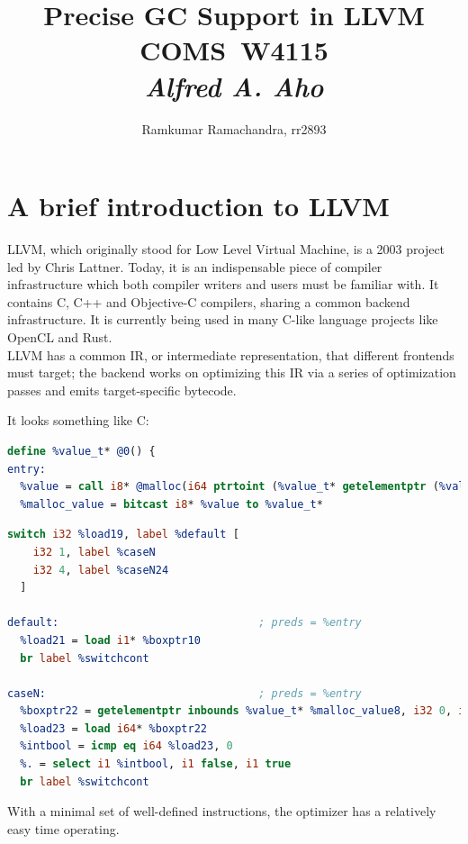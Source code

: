 \documentclass{article}
\title{
\vspace{2in}
\textmd{\textbf{Precise GC Support in LLVM}}\\
\vspace{0.1in}\large{COMS\ W4115}\\
\vspace{0.1in}\large{\textit{Alfred A. Aho}}
\vspace{2in}
}
\author{Ramkumar Ramachandra, rr2893}
\begin{document}
\maketitle
\newpage
\tableofcontents
\newpage
\section{A brief introduction to LLVM}
LLVM, which originally stood for Low Level Virtual Machine, is a 2003
project led by Chris Lattner. Today, it is an indispensable piece of
compiler infrastructure which both compiler writers and users must be
familiar with. It contains C, C++ and Objective-C compilers, sharing a
common backend infrastructure. It is currently being used in many
C-like language projects like OpenCL and Rust.\\

LLVM has a common IR, or intermediate representation, that different
frontends must target; the backend works on optimizing this IR via a
series of optimization passes and emits target-specific bytecode.

It looks something like C:
\begin{lstlisting}[language=llvm]
define %value_t* @0() {
entry:
  %value = call i8* @malloc(i64 ptrtoint (%value_t* getelementptr (%value_t* null, i32 1) to i64))
  %malloc_value = bitcast i8* %value to %value_t*
\end{lstlisting}

\begin{lstlisting}[language=llvm]
  switch i32 %load19, label %default [
    i32 1, label %caseN
    i32 4, label %caseN24
  ]

default:                               ; preds = %entry
  %load21 = load i1* %boxptr10
  br label %switchcont

caseN:                                 ; preds = %entry
  %boxptr22 = getelementptr inbounds %value_t* %malloc_value8, i32 0, i32 1
  %load23 = load i64* %boxptr22
  %intbool = icmp eq i64 %load23, 0
  %. = select i1 %intbool, i1 false, i1 true
  br label %switchcont
\end{lstlisting}
With a minimal set of well-defined instructions, the optimizer has a
relatively easy time operating.\\
\end{document}
